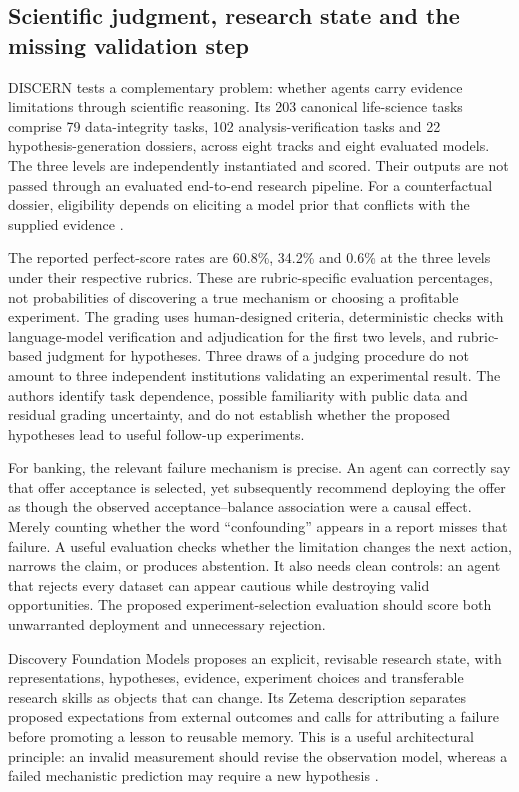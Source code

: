 \subsection{Scientific judgment, research state and the missing validation step}

DISCERN tests a complementary problem: whether agents carry evidence
limitations through scientific reasoning. Its 203 canonical life-science tasks
comprise 79 data-integrity tasks, 102 analysis-verification tasks and 22
hypothesis-generation dossiers, across eight tracks and eight evaluated models.
The three levels are independently instantiated and scored. Their outputs
are not passed through an evaluated end-to-end research pipeline. For a
counterfactual dossier, eligibility depends on eliciting a model prior that
conflicts with the supplied evidence
\cite{exec13_active_2609_33357}.

The reported perfect-score rates are 60.8\%, 34.2\% and 0.6\% at the three
levels under their respective rubrics. These are rubric-specific evaluation
percentages, not probabilities of discovering a true mechanism or choosing
a profitable experiment. The grading uses human-designed criteria,
deterministic checks with language-model verification and adjudication for
the first two levels, and rubric-based judgment for hypotheses. Three draws
of a judging procedure do not amount to three independent institutions
validating an experimental result. The authors identify task dependence,
possible familiarity with public data and residual grading uncertainty, and
do not establish whether the proposed hypotheses lead to useful follow-up
experiments.

For banking, the relevant failure mechanism is precise. An agent can correctly
say that offer acceptance is selected, yet subsequently recommend deploying
the offer as though the observed acceptance--balance association were a causal
effect. Merely counting whether the word ``confounding'' appears in a report
misses that failure. A useful evaluation checks whether the limitation changes
the next action, narrows the claim, or produces abstention. It also needs clean
controls: an agent that rejects every dataset can appear cautious while
destroying valid opportunities. The proposed experiment-selection evaluation
should score both unwarranted deployment and unnecessary rejection.

Discovery Foundation Models proposes an explicit, revisable research state,
with representations, hypotheses, evidence, experiment choices and transferable
research skills as objects that can change. Its Zetema description separates
proposed expectations from external outcomes and calls for attributing a
failure before promoting a lesson to reusable memory. This is a useful
architectural principle: an invalid measurement should revise the observation
model, whereas a failed mechanistic prediction may require a new hypothesis
\cite{exec13_active_2609_15973}.

